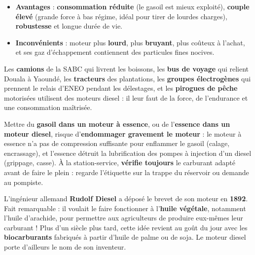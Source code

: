 \documentclass[11pt]{article}
\begin{document}
\begin{propriete}
\begin{itemize}
\item \textbf{Avantages} : \textbf{consommation réduite} (le gasoil est mieux exploité), \textbf{couple élevé} (grande force à bas régime, idéal pour tirer de lourdes charges), \textbf{robustesse} et longue durée de vie.
\item \textbf{Inconvénients} : moteur plus \textbf{lourd}, plus \textbf{bruyant}, plus coûteux à l'achat, et ses gaz d'échappement contiennent des particules fines nocives.
\end{itemize}
\end{propriete}

\begin{exemplebox}
Les \textbf{camions} de la SABC qui livrent les boissons, les \textbf{bus de voyage} qui relient Douala à Yaoundé, les \textbf{tracteurs} des plantations, les \textbf{groupes électrogènes} qui prennent le relais d'ENEO pendant les délestages, et les \textbf{pirogues de pêche} motorisées utilisent des moteurs diesel : il leur faut de la force, de l'endurance et une consommation maîtrisée.
\end{exemplebox}

\begin{attention}
Mettre du \textbf{gasoil dans un moteur à essence}, ou de l'\textbf{essence dans un moteur diesel}, risque d'\textbf{endommager gravement le moteur} : le moteur à essence n'a pas de compression suffisante pour enflammer le gasoil (calage, encrassage), et l'essence détruit la lubrification des pompes à injection d'un diesel (grippage, casse). À la station-service, \textbf{vérifie toujours} le carburant adapté avant de faire le plein : regarde l'étiquette sur la trappe du réservoir ou demande au pompiste.
\end{attention}

\begin{savaistu}
L'ingénieur allemand \textbf{Rudolf Diesel} a déposé le brevet de son moteur en \textbf{1892}. Fait remarquable : il voulait le faire fonctionner à l'\textbf{huile végétale}, notamment l'huile d'arachide, pour permettre aux agriculteurs de produire eux-mêmes leur carburant ! Plus d'un siècle plus tard, cette idée revient au goût du jour avec les \textbf{biocarburants} fabriqués à partir d'huile de palme ou de soja. Le moteur diesel porte d'ailleurs le nom de son inventeur.
\end{savaistu}
\end{document}
